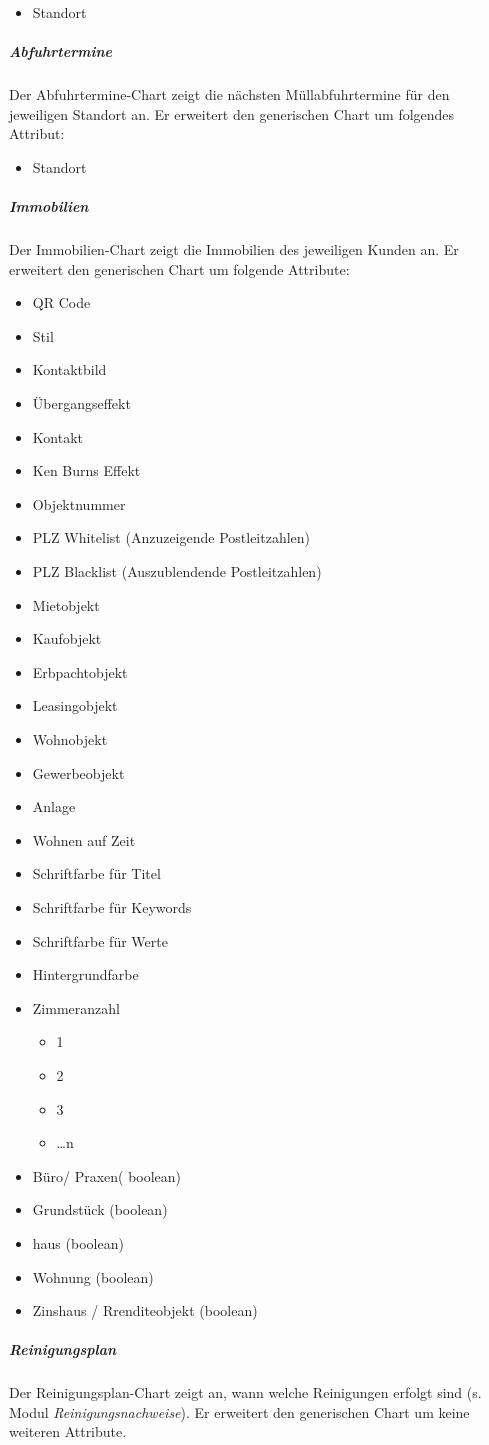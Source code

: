 \documentclass[a4paper]{article}
\begin{document}
	\begin{itemize}
	\item Standort
	\end{itemize}
	\subparagraph{Abfuhrtermine}
	Der Abfuhrtermine-Chart zeigt die nächsten Müllabfuhrtermine für den jeweiligen Standort an.
	Er erweitert den generischen Chart um folgendes Attribut:
	\begin{itemize}
	\item Standort
	\end{itemize}
	\pagebreak
	\subparagraph{Immobilien}
	Der Immobilien-Chart zeigt die Immobilien des jeweiligen Kunden an.
	Er erweitert den generischen Chart um folgende Attribute:
	\begin{itemize}
	\item QR Code
	\item Stil
	\item Kontaktbild
	\item Übergangseffekt
	\item Kontakt
	\item Ken Burns Effekt
	\item Objektnummer
	\item PLZ Whitelist (Anzuzeigende Postleitzahlen)
	\item PLZ Blacklist (Auszublendende Postleitzahlen)
	\item Mietobjekt
	\item Kaufobjekt
	\item Erbpachtobjekt
	\item Leasingobjekt
	\item Wohnobjekt
	\item Gewerbeobjekt
	\item Anlage
	\item Wohnen auf Zeit
	\item Schriftfarbe für Titel
	\item Schriftfarbe für Keywords
	\item Schriftfarbe für Werte
	\item Hintergrundfarbe
	\item Zimmeranzahl
		\begin{itemize}
		\item 1
		\item 2
		\item 3
		\item …n
		\end{itemize}
	\item Büro/ Praxen( boolean)
	\item Grundstück (boolean)
	\item haus (boolean)
	\item Wohnung (boolean)
	\item Zinshaus / Rrenditeobjekt (boolean)
	\end{itemize}
	\subparagraph{Reinigungsplan}
	Der Reinigungsplan-Chart zeigt an, wann welche Reinigungen erfolgt sind (s. Modul \emph{Reinigungsnachweise}).
	Er erweitert den generischen Chart um keine weiteren Attribute.
\end{document}
